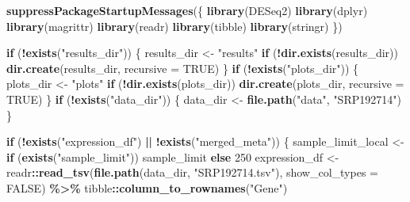 \documentclass[
]{article}
\newenvironment{Shaded}{\begin{snugshade}}{\end{snugshade}}
\newcommand{\AttributeTok}[1]{\textcolor[rgb]{0.13,0.29,0.53}{#1}}
\newcommand{\ConstantTok}[1]{\textcolor[rgb]{0.56,0.35,0.01}{#1}}
\newcommand{\ControlFlowTok}[1]{\textcolor[rgb]{0.13,0.29,0.53}{\textbf{#1}}}
\newcommand{\DecValTok}[1]{\textcolor[rgb]{0.00,0.00,0.81}{#1}}
\newcommand{\FunctionTok}[1]{\textcolor[rgb]{0.13,0.29,0.53}{\textbf{#1}}}
\newcommand{\NormalTok}[1]{#1}
\newcommand{\OtherTok}[1]{\textcolor[rgb]{0.56,0.35,0.01}{#1}}
\newcommand{\SpecialCharTok}[1]{\textcolor[rgb]{0.81,0.36,0.00}{\textbf{#1}}}
\newcommand{\StringTok}[1]{\textcolor[rgb]{0.31,0.60,0.02}{#1}}
\begin{document}
\begin{Shaded}
\begin{Highlighting}[]
\FunctionTok{suppressPackageStartupMessages}\NormalTok{(\{}
  \FunctionTok{library}\NormalTok{(DESeq2)}
  \FunctionTok{library}\NormalTok{(dplyr)}
  \FunctionTok{library}\NormalTok{(magrittr)}
  \FunctionTok{library}\NormalTok{(readr)}
  \FunctionTok{library}\NormalTok{(tibble)}
  \FunctionTok{library}\NormalTok{(stringr)}
\NormalTok{\})}

\ControlFlowTok{if}\NormalTok{ (}\SpecialCharTok{!}\FunctionTok{exists}\NormalTok{(}\StringTok{"results\_dir"}\NormalTok{)) \{}
\NormalTok{  results\_dir }\OtherTok{\textless{}{-}} \StringTok{"results"}
  \ControlFlowTok{if}\NormalTok{ (}\SpecialCharTok{!}\FunctionTok{dir.exists}\NormalTok{(results\_dir)) }\FunctionTok{dir.create}\NormalTok{(results\_dir, }\AttributeTok{recursive =} \ConstantTok{TRUE}\NormalTok{)}
\NormalTok{\}}
\ControlFlowTok{if}\NormalTok{ (}\SpecialCharTok{!}\FunctionTok{exists}\NormalTok{(}\StringTok{"plots\_dir"}\NormalTok{)) \{}
\NormalTok{  plots\_dir }\OtherTok{\textless{}{-}} \StringTok{"plots"}
  \ControlFlowTok{if}\NormalTok{ (}\SpecialCharTok{!}\FunctionTok{dir.exists}\NormalTok{(plots\_dir)) }\FunctionTok{dir.create}\NormalTok{(plots\_dir, }\AttributeTok{recursive =} \ConstantTok{TRUE}\NormalTok{)}
\NormalTok{\}}
\ControlFlowTok{if}\NormalTok{ (}\SpecialCharTok{!}\FunctionTok{exists}\NormalTok{(}\StringTok{"data\_dir"}\NormalTok{)) \{}
\NormalTok{  data\_dir }\OtherTok{\textless{}{-}} \FunctionTok{file.path}\NormalTok{(}\StringTok{"data"}\NormalTok{, }\StringTok{"SRP192714"}\NormalTok{)}
\NormalTok{\}}

\ControlFlowTok{if}\NormalTok{ (}\SpecialCharTok{!}\FunctionTok{exists}\NormalTok{(}\StringTok{"expression\_df"}\NormalTok{) }\SpecialCharTok{||} \SpecialCharTok{!}\FunctionTok{exists}\NormalTok{(}\StringTok{"merged\_meta"}\NormalTok{)) \{}
\NormalTok{  sample\_limit\_local }\OtherTok{\textless{}{-}} \ControlFlowTok{if}\NormalTok{ (}\FunctionTok{exists}\NormalTok{(}\StringTok{"sample\_limit"}\NormalTok{)) sample\_limit }\ControlFlowTok{else} \DecValTok{250}
\NormalTok{  expression\_df }\OtherTok{\textless{}{-}}\NormalTok{ readr}\SpecialCharTok{::}\FunctionTok{read\_tsv}\NormalTok{(}\FunctionTok{file.path}\NormalTok{(data\_dir, }\StringTok{"SRP192714.tsv"}\NormalTok{), }\AttributeTok{show\_col\_types =} \ConstantTok{FALSE}\NormalTok{) }\SpecialCharTok{\%\textgreater{}\%}
\NormalTok{    tibble}\SpecialCharTok{::}\FunctionTok{column\_to\_rownames}\NormalTok{(}\StringTok{"Gene"}\NormalTok{)}


\end{Highlighting}
\end{Shaded}
\end{document}
